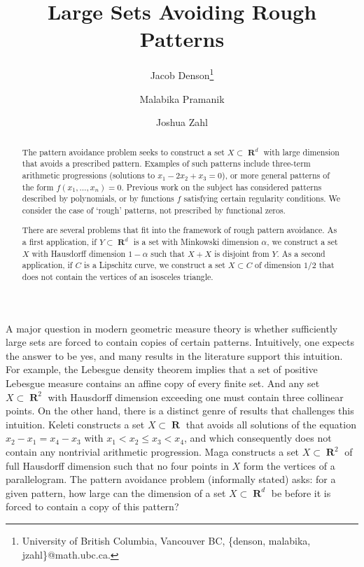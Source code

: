 \documentclass[dvipsnames,letterpaper,12pt]{article}
\title{Large Sets Avoiding Rough Patterns}
\author{Jacob Denson\thanks{University of British Columbia, Vancouver BC, \{denson, malabika, jzahl\}@math.ubc.ca.} \and Malabika Pramanik\footnotemark[1] \and Joshua Zahl\footnotemark[1]}
\numberwithin{equation}{section}
\theoremstyle{plain}
\theoremstyle{remark}
\DeclareMathOperator{\RR}{\mathbf{R}}
\begin{document}
\maketitle

\begin{abstract}
	The pattern avoidance problem seeks to construct a set $X\subset \RR^d$ with large dimension that avoids a prescribed pattern. Examples of such patterns include three-term arithmetic progressions (solutions to $x_1 - 2x_2 + x_3 = 0$), or more general patterns of the form $f(x_1, \dots, x_n) = 0$. Previous work on the subject has considered patterns described by polynomials, or by functions $f$ satisfying certain regularity conditions. We consider the case of `rough' patterns, not prescribed by functional zeros.

	There are several problems that fit into the framework of rough pattern avoidance. As a first application, if $Y \subset \RR^d$ is a set with Minkowski dimension $\alpha$, we construct a set $X$ with Hausdorff dimension $1-\alpha$ such that $X+X$ is disjoint from $Y$. As a second application, if $C$ is a Lipschitz curve, we construct a set $X \subset C$ of dimension $1/2$ that does not contain the vertices of an isosceles triangle.
\end{abstract}



A major question in modern geometric measure theory is whether sufficiently large sets are forced to contain copies of certain patterns. Intuitively, one expects the answer to be yes, and many results in the literature support this intuition. For example, the Lebesgue density theorem implies that a set of positive Lebesgue measure contains an affine copy of every finite set.
%
%
%
And any set $X \subset \RR^2$ with Hausdorff dimension exceeding one must contain three collinear points.
%
On the other hand, there is a distinct genre of results that challenges this intuition. Keleti \cite{KeletiDimOneSet} constructs a set $X \subset \RR$ that avoids all solutions of the equation $x_2 - x_1 = x_4 - x_3$ with $x_1 < x_2 \leq x_3 < x_4$, and which consequently does not contain any nontrivial arithmetic progression. Maga \cite{Maga} constructs a set $X \subset \RR^2$ of full Hausdorff dimension such that no four points in $X$ form the vertices of a parallelogram. The pattern avoidance problem (informally stated) asks: for a given pattern, how large can the dimension of a set $X \subset \RR^d$ be before it is forced to contain a copy of this pattern? 
\end{document}
